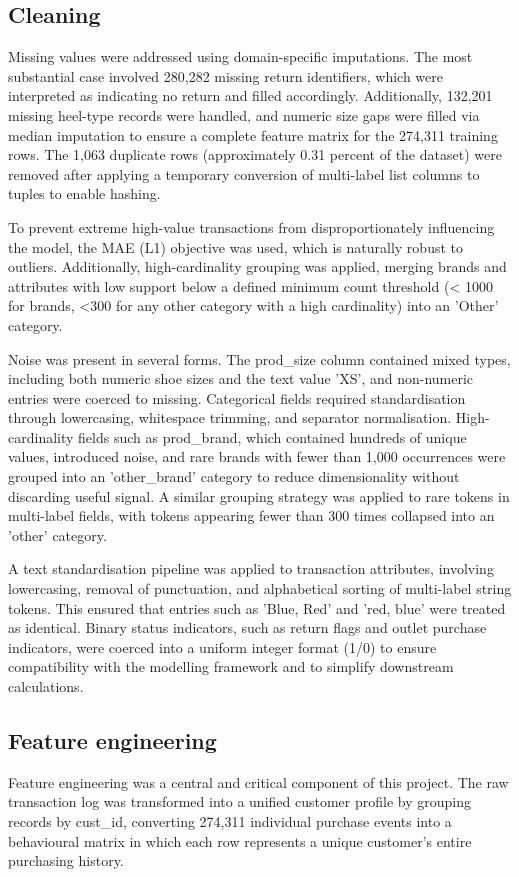 \subsection{Cleaning}
Missing values were addressed using domain-specific imputations. The most substantial case involved 280,282 missing return identifiers, which were interpreted as indicating no return and filled accordingly. Additionally, 132,201 missing heel-type records were handled, and numeric size gaps were filled via median imputation to ensure a complete feature matrix for the 274,311 training rows. The 1,063 duplicate rows (approximately 0.31 percent of the dataset) were removed after applying a temporary conversion of multi-label list columns to tuples to enable hashing.

To prevent extreme high-value transactions from disproportionately influencing the model, the MAE (L1) objective was used, which is naturally robust to outliers. Additionally, high-cardinality grouping was applied, merging brands and attributes with low support below a defined minimum count threshold (< 1000 for brands, <300 for any other category with a high cardinality) into an 'Other' category.

Noise was present in several forms. The prod\_size column contained mixed types, including both numeric shoe sizes and the text value 'XS', and non-numeric entries were coerced to missing. Categorical fields required standardisation through lowercasing, whitespace trimming, and separator normalisation. High-cardinality fields such as prod\_brand, which contained hundreds of unique values, introduced noise, and rare brands with fewer than 1,000 occurrences were grouped into an 'other\_brand' category to reduce dimensionality without discarding useful signal. A similar grouping strategy was applied to rare tokens in multi-label fields, with tokens appearing fewer than 300 times collapsed into an 'other' category.

A text standardisation pipeline was applied to transaction attributes, involving lowercasing, removal of punctuation, and alphabetical sorting of multi-label string tokens. This ensured that entries such as 'Blue, Red' and 'red, blue' were treated as identical. Binary status indicators, such as return flags and outlet purchase indicators, were coerced into a uniform integer format (1/0) to ensure compatibility with the modelling framework and to simplify downstream calculations.

\subsection{Feature engineering}
Feature engineering was a central and critical component of this project. The raw transaction log was transformed into a unified customer profile by grouping records by cust\_id, converting 274,311 individual purchase events into a behavioural matrix in which each row represents a unique customer's entire purchasing history.

